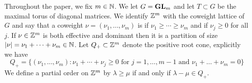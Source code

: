 \documentclass[draft]{article} %
\begin{document}
Throughout the paper, we fix $ m \in \mathbb N$.  We let $G = {\mathbf{GL}}_m$ and let $T\subset G$ be the maximal torus of diagonal matrices. 
We identify $\mathbb Z^m$ with the coweight lattice of $G$ and say that a coweight 
% 
% 
% 
$\nu = (\nu_1,\dots,\nu_m)$ is  if $\nu_1\ge\cdots\ge\nu_m$ and  if $\nu_j\ge 0$ for all $j$.
% 
If $\nu\in\mathbb Z^m$ is both effective and dominant then it is a partition of size $|\nu| = \nu_1 + \cdots + \nu_m\in\mathbb N$.  Let $ Q_+ \subset \mathbb Z^m$ denote the positive root cone, explicitly we have
$$
Q_+ = \{ (\nu_1, \dots, \nu_m) : \nu_1 + \cdots + \nu_j \ge 0 \text{ for $j = 1, \dots, m-1 $ and } \nu_1 + \dots + \nu_m = 0 \}
$$
We define a partial order on $ \mathbb Z^m$ by $ \lambda \ge \mu $ if and only if $ \lambda - \mu \in Q_+ $.
\end{document}
